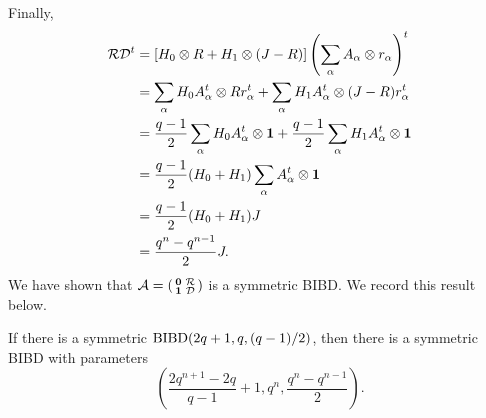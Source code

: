 \documentclass[../../../main]{subfiles}
\begin{document}
Finally,
\begin{align*}
 \mathcal{R}\mathcal{D}^t &= [H_0 \otimes R + H_1 \otimes (J-R)] \left( \sum_\alpha A_\alpha \otimes r_\alpha \right)^t \\
 &= \sum_\alpha H_0A_\alpha^t \otimes Rr_\alpha^t + \sum_\alpha H_1A_\alpha^t \otimes (J-R)r_\alpha^t \\
 &= \frac{q-1}{2}\sum_\alpha H_0A_\alpha^t \otimes \mathbf{1} + \frac{q-1}{2}\sum_\alpha H_1A_\alpha^t \otimes \mathbf{1} \\
 &= \frac{q-1}{2}(H_0+H_1)\sum_\alpha A_\alpha^t \otimes \mathbf{1} \\
 &= \frac{q-1}{2}(H_0+H_1)J \\
 &= \frac{q^n-q^{n-1}}{2}J.
\end{align*}
We have shown that $\mathcal{A} = \left(\begin{smallmatrix} \mathbf{0} & \mathcal{R} \\ \mathbf{1} & \mathcal{D} \end{smallmatrix}\right)$ is a symmetric BIBD. We record this result below.

\begin{thm}
 If there is a symmetric $\text{BIBD}(2q+1,q,(q-1)/2)$, then there is a symmetric BIBD with parameters
 \begin{equation}
  \left(
  \frac{2q^{n+1}-2q}{q-1}+1, q^n, \frac{q^n-q^{n-1}}{2}
  \right).
 \end{equation}
\end{thm}
\end{document}

